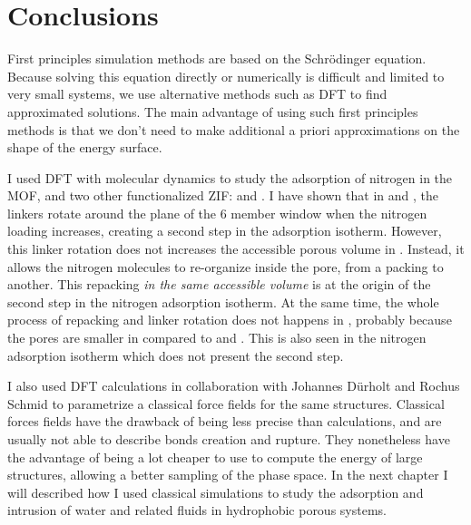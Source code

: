 \documentclass[thesis]{subfiles}
\begin{document}
\section*{Conclusions}

First principles simulation methods are based on the Schrödinger equation.
Because solving this equation directly or numerically is difficult and limited
to very small systems, we use alternative methods such as DFT to find
approximated solutions. The main advantage of using such first principles
methods is that we don't need to make additional a priori approximations on the
shape of the energy surface.

I used DFT with molecular dynamics to study the adsorption of nitrogen in the
 MOF, and two other functionalized ZIF: \ZIFCl and \ZIFBr. I have shown
that in  and \ZIFCl, the linkers rotate around the plane of the 6 member
window when the nitrogen loading increases, creating a second step in the
adsorption isotherm. However, this linker rotation does not increases the
accessible porous volume in . Instead, it allows the nitrogen molecules to
re-organize inside the pore, from a packing to another. This repacking \emph{in
the same accessible volume} is at the origin of the second step in the nitrogen
adsorption isotherm. At the same time, the whole process of repacking and linker
rotation does not happens in \ZIFBr, probably because the pores are smaller in
\ZIFBr compared to  and \ZIFCl. This is also seen in the nitrogen
adsorption isotherm which does not present the second step.

I also used DFT calculations in collaboration with Johannes Dürholt and Rochus
Schmid to parametrize a classical force fields for the same structures.
Classical forces fields have the drawback of being less precise than \abinitio
calculations, and are usually not able to describe bonds creation and rupture.
They nonetheless have the advantage of being a lot cheaper to use to compute the
energy of large structures, allowing a better sampling of the phase space. In
the next chapter I will described how I used classical simulations to study the
adsorption and intrusion of water and related fluids in hydrophobic porous
systems.

\OnlyInSubfile{\printbibliography}
\end{document}
